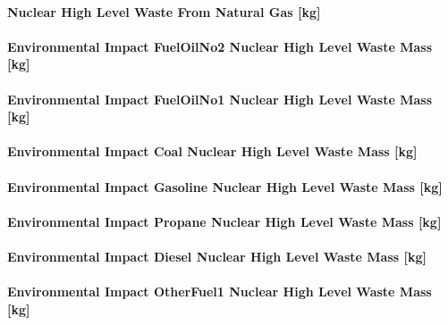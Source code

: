 \paragraph{Nuclear High Level Waste From Natural Gas {[}kg{]}}\label{nuclear-high-level-waste-from-natural-gas-kg}

\paragraph{Environmental Impact FuelOilNo2 Nuclear High Level Waste Mass {[}kg{]}}\label{environmental-impact-fuel-oil-2-nuclear-high-level-waste-mass-kg}

\paragraph{Environmental Impact FuelOilNo1 Nuclear High Level Waste Mass {[}kg{]}}\label{environmental-impact-fuel-oil-1-nuclear-high-level-waste-mass-kg}

\paragraph{Environmental Impact Coal Nuclear High Level Waste Mass {[}kg{]}}\label{environmental-impact-coal-nuclear-high-level-waste-mass-kg}

\paragraph{Environmental Impact Gasoline Nuclear High Level Waste Mass {[}kg{]}}\label{environmental-impact-gasoline-nuclear-high-level-waste-mass-kg}

\paragraph{Environmental Impact Propane Nuclear High Level Waste Mass {[}kg{]}}\label{environmental-impact-propane-nuclear-high-level-waste-mass-kg}

\paragraph{Environmental Impact Diesel Nuclear High Level Waste Mass {[}kg{]}}\label{environmental-impact-diesel-nuclear-high-level-waste-mass-kg}

\paragraph{Environmental Impact OtherFuel1 Nuclear High Level Waste Mass {[}kg{]}}\label{environmental-impact-otherfuel1-nuclear-high-level-waste-mass-kg}

